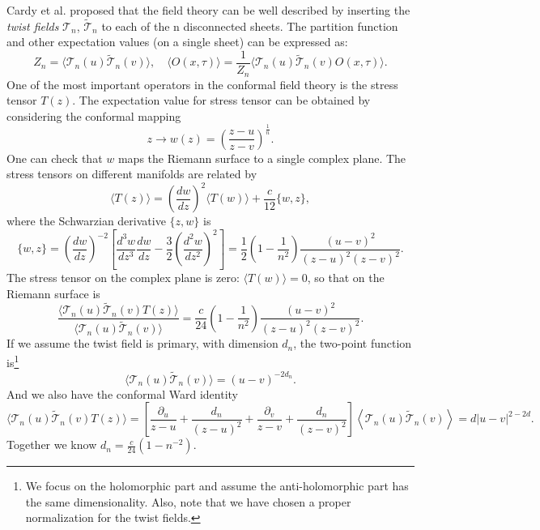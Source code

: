\documentclass[aps,prb,superscriptaddress,nofootinbib]{revtex4}
\begin{document}
Cardy et al. proposed that the field theory can be well described by inserting the \textit{twist fields} $\mathcal T_n$, $\tilde{\mathcal T}_n$ to each of the n disconnected sheets.
The partition function and other expectation values (on a single sheet) can be expressed as:
\begin{equation}
	Z_n = \langle \mathcal{T}_n(u) \tilde{\mathcal{T}}_n(v)\rangle, \quad
	\langle O(x,\tau)\rangle = \frac{1}{Z_n}\langle\mathcal{T}_n(u) \tilde{\mathcal{T}}_n(v) O(x,\tau) \rangle.
\end{equation}
One of the most important operators in the conformal field theory is the stress tensor $T(z)$.
The expectation value for stress tensor can be obtained by considering the conformal mapping
\begin{equation}
	z \rightarrow w(z) = \left(\frac{z-u}{z-v}\right)^{\frac{1}{n}}.
\end{equation} 
One can check that $w$ maps the Riemann surface to a single complex plane.
The stress tensors on different manifolds are related by
\begin{equation}
	\langle T(z) \rangle = \left(\frac{d w}{d z}\right)^{2} \langle T(w)\rangle + \frac{c}{12}\{w, z\},
\end{equation}
where the Schwarzian derivative $\{z, w\}$ is
\begin{equation}
	\{w,z\} = \left(\frac{dw}{dz}\right)^{-2} \left[\frac{d^3 w}{dz^3}\frac{dw}{dz} - \frac{3}{2}\left(\frac{d^2 w}{dz^2}\right)^2\right] 
	= \frac{1}{2}\left(1-\frac{1}{n^2}\right)\frac{(u-v)^2}{(z-u)^2(z-v)^2}.
\end{equation}
The stress tensor on the complex plane is zero: $\langle T(w)\rangle=0$, so that on the Riemann surface is
\begin{equation}
	\frac{\langle\mathcal{T}_n(u) \tilde{\mathcal{T}}_n(v) T(z) \rangle}{\langle\mathcal{T}_n(u) \tilde{\mathcal{T}}_n(v) \rangle} 
	= \frac{c}{24}\left(1-\frac{1}{n^2}\right)\frac{(u-v)^2}{(z-u)^2(z-v)^2}.
\end{equation}
If we assume the twist field is primary, with dimension $d_n$, the two-point function is\footnote{We focus on the holomorphic part and assume the anti-holomorphic part has the same dimensionality. Also, note that we have chosen a proper normalization for the twist fields.}
\begin{equation}
	\langle\mathcal{T}_n(u) \tilde{\mathcal{T}}_n(v) \rangle
	= (u-v)^{-2d_n}.
\end{equation}
And we also have the conformal Ward identity
\begin{equation}
	\langle\mathcal{T}_n(u) \tilde{\mathcal{T}}_n(v) T(z) \rangle
	= \left[\frac{\partial_u}{z-u} +\frac{d_n}{(z-u)^{2}}+\frac{\partial_v}{z-v} + \frac{d_n}{(z-v)^{2}}\right] \left\langle\mathcal{T}_{n}(u) \tilde{\mathcal{T}}_{n}(v)\right\rangle 
	= d|u-v|^{2-2d}.
\end{equation}
Together we know $d_n = \frac{c}{24}\left(1-n^{-2}\right)$.
\end{document}
